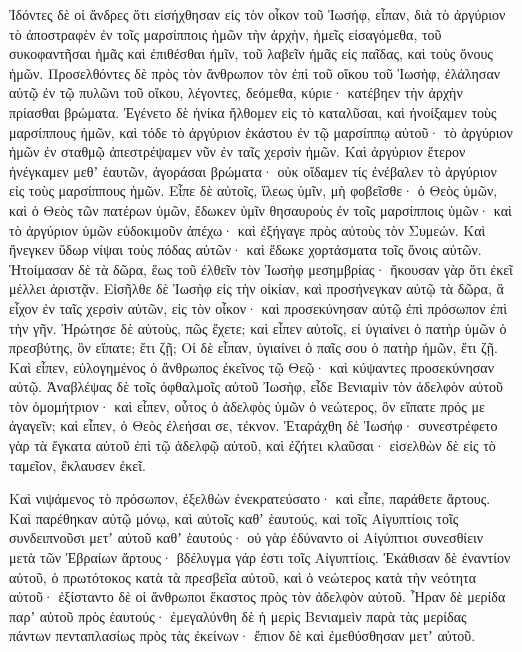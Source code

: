 {Ἰδόντες δὲ οἱ ἄνδρες ὅτι εἰσήχθησαν εἰς τὸν οἶκον τοῦ Ἰωσήφ, εἶπαν, διὰ τὸ ἀργύριον τὸ ἀποστραφὲν ἐν τοῖς μαρσίπποις ἡμῶν τὴν ἀρχὴν, ἡμεῖς εἰσαγόμεθα, τοῦ συκοφαντῆσαι ἡμᾶς καὶ ἐπιθέσθαι ἡμῖν, τοῦ λαβεῖν ἡμᾶς εἰς παῖδας, καὶ τοὺς ὄνους ἡμῶν.
Προσελθόντες δὲ πρὸς τὸν ἄνθρωπον τὸν ἐπὶ τοῦ οἴκου τοῦ Ἰωσὴφ, ἐλάλησαν αὐτῷ ἐν τῷ πυλῶνι τοῦ οἴκου,
λέγοντες, δεόμεθα, κύριε· κατέβηεν τὴν ἀρχὴν πρίασθαι βρώματα.
Ἐγένετο δὲ ἡνίκα ἤλθομεν εἰς τὸ καταλῦσαι, καὶ ἠνοίξαμεν τοὺς μαρσίππους ἡμῶν, καὶ τόδε τὸ ἀργύριον ἑκάστου ἐν τῷ μαρσίππῳ αὐτοῦ· τὸ ἀργύριον ἡμῶν ἐν σταθμῷ ἀπεστρέψαμεν νῦν ἐν ταῖς χερσὶν ἡμῶν.
Καὶ ἀργύριον ἕτερον ἠνέγκαμεν μεθʼ ἑαυτῶν, ἀγοράσαι βρώματα· οὐκ οἴδαμεν τίς ἐνέβαλεν τὸ ἀργύριον εἰς τοὺς μαρσίππους ἡμῶν.
Εἶπε δὲ αὐτοῖς, ἵλεως ὑμῖν, μὴ φοβεῖσθε· ὁ Θεὸς ὑμῶν, καὶ ὁ Θεὸς τῶν πατέρων ὑμῶν, ἔδωκεν ὑμῖν θησαυροὺς ἐν τοῖς μαρσίπποις ὑμῶν· καὶ τὸ ἀργύριον ὑμῶν εὐδοκιμοῦν ἀπέχω· καὶ ἐξήγαγε πρὸς αὐτοὺς τὸν Συμεών.
Καὶ ἤνεγκεν ὕδωρ νίψαι τοὺς πόδας αὐτῶν· καὶ ἔδωκε χορτάσματα τοῖς ὄνοις αὐτῶν.
Ἡτοίμασαν δὲ τὰ δῶρα, ἕως τοῦ ἐλθεῖν τὸν Ἰωσὴφ μεσημβρίας· ἤκουσαν γὰρ ὅτι ἐκεῖ μέλλει ἀριστᾷν.
Εἰσῆλθε δὲ Ἰωσὴφ εἰς τὴν οἰκίαν, καὶ προσήνεγκαν αὐτῷ τὰ δῶρα, ἃ εἶχον ἐν ταῖς χερσὶν αὐτῶν, εἰς τὸν οἶκον· καὶ προσεκύνησαν αὐτῷ ἐπὶ πρόσωπον ἐπὶ τὴν γῆν.
Ἠρώτησε δὲ αὐτοὺς, πῶς ἔχετε; καὶ εἶπεν αὐτοῖς, εἰ ὑγιαίνει ὁ πατὴρ ὑμῶν ὁ πρεσβύτης, ὃν εἴπατε; ἔτι ζῇ;
Οἱ δὲ εἶπαν, ὑγιαίνει ὁ παῖς σου ὁ πατὴρ ἡμῶν, ἔτι ζῇ. Καὶ εἶπεν, εὐλογημένος ὁ ἄνθρωπος ἐκεῖνος τῷ Θεῷ· καὶ κύψαντες προσεκύνησαν αὐτῷ.
Ἀναβλέψας δὲ τοῖς ὀφθαλμοῖς αὐτοῦ Ἰωσὴφ, εἶδε Βενιαμὶν τὸν ἀδελφὸν αὐτοῦ τὸν ὁμομήτριον· καὶ εἶπεν, οὗτος ὁ ἀδελφὸς ὑμῶν ὁ νεώτερος, ὃν εἴπατε πρός με ἀγαγεῖν; καὶ εἶπεν, ὁ Θεὸς ἐλεήσαι σε, τέκνον.
Ἐταράχθη δὲ Ἰωσήφ· συνεστρέφετο γὰρ τὰ ἔγκατα αὐτοῦ ἐπὶ τῷ ἀδελφῷ αὐτοῦ, καὶ ἐζήτει κλαῦσαι· εἰσελθὼν δὲ εἰς τὸ ταμεῖον, ἔκλαυσεν ἐκεῖ.
\par }{\PP {}Καὶ νιψάμενος τὸ πρόσωπον, ἐξελθὼν ἐνεκρατεύσατο· καὶ εἶπε, παράθετε ἄρτους.
Καὶ παρέθηκαν αὐτῷ μόνῳ, καὶ αὐτοῖς καθʼ ἑαυτούς, καὶ τοῖς Αἰγυπτίοις τοῖς συνδειπνοῦσι μετʼ αὐτοῦ καθʼ ἑαυτούς· οὐ γὰρ ἐδύναντο οἱ Αἰγύπτιοι συνεσθίειν μετὰ τῶν Ἐβραίων ἄρτους· βδέλυγμα γάρ ἐστι τοῖς Αἰγυπτίοις.
Ἐκάθισαν δὲ ἐναντίον αὐτοῦ, ὁ πρωτότοκος κατὰ τὰ πρεσβεῖα αὐτοῦ, καὶ ὁ νεώτερος κατὰ τὴν νεότητα αὐτοῦ· ἐξίσταντο δὲ οἱ ἄνθρωποι ἕκαστος πρὸς τὸν ἀδελφὸν αὐτοῦ.
Ἦραν δὲ μερίδα παρʼ αὐτοῦ πρὸς ἑαυτούς· ἐμεγαλύνθη δὲ ἡ μερὶς Βενιαμεὶν παρὰ τὰς μερίδας πάντων πενταπλασίως πρὸς τὰς ἐκείνων· ἔπιον δὲ καὶ ἐμεθύσθησαν μετʼ αὐτοῦ.

}
